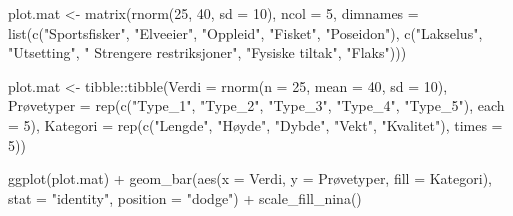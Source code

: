 \documentclass[11pt, a4paper]{article}
\newenvironment{Shaded}{\begin{snugshade}}{\end{snugshade}}
\newcommand{\AttributeTok}[1]{\textcolor[rgb]{0.40,0.45,0.13}{#1}}
\newcommand{\DecValTok}[1]{\textcolor[rgb]{0.68,0.00,0.00}{#1}}
\newcommand{\FunctionTok}[1]{\textcolor[rgb]{0.28,0.35,0.67}{#1}}
\newcommand{\NormalTok}[1]{\textcolor[rgb]{0.00,0.23,0.31}{#1}}
\newcommand{\OtherTok}[1]{\textcolor[rgb]{0.00,0.23,0.31}{#1}}
\newcommand{\SpecialCharTok}[1]{\textcolor[rgb]{0.37,0.37,0.37}{#1}}
\newcommand{\StringTok}[1]{\textcolor[rgb]{0.13,0.47,0.30}{#1}}
\begin{document}
\begin{Shaded}
\begin{Highlighting}[]
\NormalTok{plot.mat }\OtherTok{\textless{}{-}} \FunctionTok{matrix}\NormalTok{(}\FunctionTok{rnorm}\NormalTok{(}\DecValTok{25}\NormalTok{, }\DecValTok{40}\NormalTok{, }\AttributeTok{sd =} \DecValTok{10}\NormalTok{), }\AttributeTok{ncol =} \DecValTok{5}\NormalTok{,}
    \AttributeTok{dimnames =} \FunctionTok{list}\NormalTok{(}\FunctionTok{c}\NormalTok{(}\StringTok{"Sportsfisker"}\NormalTok{, }\StringTok{"Elveeier"}\NormalTok{, }\StringTok{"Oppleid"}\NormalTok{,}
        \StringTok{"Fisket"}\NormalTok{, }\StringTok{"Poseidon"}\NormalTok{), }\FunctionTok{c}\NormalTok{(}\StringTok{"Lakselus"}\NormalTok{, }\StringTok{"Utsetting"}\NormalTok{,}
        \StringTok{" Strengere restriksjoner"}\NormalTok{, }\StringTok{"Fysiske tiltak"}\NormalTok{,}
        \StringTok{"Flaks"}\NormalTok{)))}

\NormalTok{plot.mat }\OtherTok{\textless{}{-}}\NormalTok{ tibble}\SpecialCharTok{::}\FunctionTok{tibble}\NormalTok{(}\AttributeTok{Verdi =} \FunctionTok{rnorm}\NormalTok{(}\AttributeTok{n =} \DecValTok{25}\NormalTok{, }\AttributeTok{mean =} \DecValTok{40}\NormalTok{,}
    \AttributeTok{sd =} \DecValTok{10}\NormalTok{), Prøvetyper }\OtherTok{=} \FunctionTok{rep}\NormalTok{(}\FunctionTok{c}\NormalTok{(}\StringTok{"Type\_1"}\NormalTok{, }\StringTok{"Type\_2"}\NormalTok{,}
    \StringTok{"Type\_3"}\NormalTok{, }\StringTok{"Type\_4"}\NormalTok{, }\StringTok{"Type\_5"}\NormalTok{), }\AttributeTok{each =} \DecValTok{5}\NormalTok{), }\AttributeTok{Kategori =} \FunctionTok{rep}\NormalTok{(}\FunctionTok{c}\NormalTok{(}\StringTok{"Lengde"}\NormalTok{,}
    \StringTok{"Høyde"}\NormalTok{, }\StringTok{"Dybde"}\NormalTok{, }\StringTok{"Vekt"}\NormalTok{, }\StringTok{"Kvalitet"}\NormalTok{), }\AttributeTok{times =} \DecValTok{5}\NormalTok{))}

\FunctionTok{ggplot}\NormalTok{(plot.mat) }\SpecialCharTok{+} \FunctionTok{geom\_bar}\NormalTok{(}\FunctionTok{aes}\NormalTok{(}\AttributeTok{x =}\NormalTok{ Verdi, }\AttributeTok{y =}\NormalTok{ Prøvetyper,}
    \AttributeTok{fill =}\NormalTok{ Kategori), }\AttributeTok{stat =} \StringTok{"identity"}\NormalTok{, }\AttributeTok{position =} \StringTok{"dodge"}\NormalTok{) }\SpecialCharTok{+}
    \FunctionTok{scale\_fill\_nina}\NormalTok{()}
\end{Highlighting}
\end{Shaded}
\end{document}
